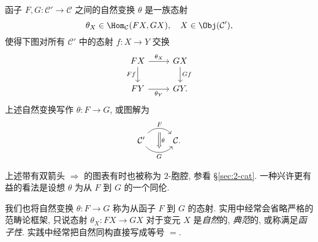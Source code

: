 \begin{definition}
	函子 $F, G: \mathcal{C}' \to \mathcal{C}$ 之间的自然变换 $\theta$ 是一族态射
	\[ \theta_X \in \Hom_{\mathcal{C}}(FX, GX), \quad X \in \Obj(\mathcal{C}'), \]
	使得下图对所有 $\mathcal{C}'$ 中的态射 $f: X \to Y$ 交换
	\begin{equation}\label{eqn:naturaltrans-def}\begin{tikzcd}
		FX \arrow[r, "\theta_X"] \ar[d, "Ff"'] & GX \arrow[d, "Gf"] \\
		FY \arrow[r, "\theta_Y"'] & GY .
	\end{tikzcd}\end{equation}
	上述自然变换写作 $\theta: F \to G$, 或图解为
	\[ \begin{tikzcd}
		\mathcal{C}' \arrow[bend left=50, r, "F", ""' name=U] \arrow[bend right=50, r, "G"', "" name=D] & \arrow[Rightarrow, to path=(U) -- (D) \tikztonodes, "\theta"] \mathcal{C}.
	\end{tikzcd} \]
\end{definition}
上述带有双箭头 $\Rightarrow$ 的图表有时也被称为 $2$-胞腔, 参看 \S\ref{sec:2-cat}. 一种兴许更有益的看法是设想 $\theta$ 为从 $F$ 到 $G$ 的一个同伦.

\begin{convention}\label{con:naturaltrans-morphism}
	我们也将自然变换 $\theta: F \to G$ 称为从函子 $F$ 到 $G$ 的态射. 实用中经常会省略严格的范畴论框架, 只说态射 $\theta_X: FX \to GX$ 对于变元 $X$ 是\emph{自然}的, \emph{典范}的, 或称满足\emph{函子性}. 实践中经常把自然同构直接写成等号 $=$.
\end{convention}

